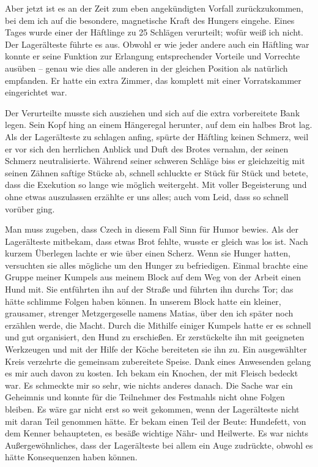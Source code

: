 \documentclass[a4paper,12pt,ngerman,
]{nisebook}
\begin{document}
Aber jetzt ist es an der Zeit zum eben angekündigten Vorfall zurückzukommen, bei dem ich auf die besondere, magnetische Kraft des Hungers eingehe. Eines Tages wurde einer der Häftlinge zu 25 Schlägen verurteilt; wofür weiß ich nicht. Der Lagerälteste führte es aus. Obwohl er wie jeder andere auch ein Häftling war konnte er seine Funktion zur Erlangung entsprechender Vorteile und Vorrechte ausüben -- genau wie dies alle anderen in der gleichen Position als natürlich empfanden. Er hatte ein extra Zimmer, das komplett mit einer Vorratskammer eingerichtet war.

Der Verurteilte musste sich ausziehen und sich auf die extra vorbereitete Bank legen. Sein Kopf hing an einem Hängeregal herunter, auf dem ein halbes Brot lag. Als der Lagerälteste zu schlagen anfing, spürte der Häftling keinen Schmerz, weil er vor sich den herrlichen Anblick und Duft des Brotes vernahm, der seinen Schmerz neutralisierte. Während seiner schweren Schläge biss er gleichzeitig mit seinen Zähnen saftige Stücke ab, schnell schluckte er Stück für Stück und betete, dass die Exekution so lange wie möglich weitergeht. Mit voller Begeisterung und ohne etwas auszulassen erzählte er uns alles; auch vom Leid, dass so schnell vorüber ging.

Man muss zugeben, dass Czech in diesem Fall Sinn für Humor bewies. Als der Lagerälteste mitbekam, dass etwas Brot fehlte, wusste er gleich was los ist. 
Nach kurzem Überlegen lachte er wie über einen Scherz. Wenn sie Hunger hatten, versuchten sie alles mögliche um den Hunger zu befriedigen. Einmal brachte eine Gruppe meiner Kumpels aus meinem Block auf dem Weg von der Arbeit einen Hund mit. Sie entführten ihn auf der Straße und führten ihn durchs Tor; das hätte schlimme Folgen haben können. In unserem Block hatte ein kleiner, grausamer, strenger Metzgergeselle namens Matias, über den ich später noch erzählen werde, die Macht. Durch die Mithilfe einiger Kumpels hatte er es schnell und gut organisiert, den Hund zu erschießen. Er zerstückelte ihn mit geeigneten Werkzeugen und mit der Hilfe der Köche bereiteten sie ihn zu. Ein ausgewählter Kreis verzehrte die gemeinsam zubereitete Speise. Dank eines Anwesenden gelang es mir auch davon zu kosten. Ich bekam ein Knochen, der mit Fleisch bedeckt war. Es schmeckte mir so sehr, wie nichts anderes danach. Die Sache war ein Geheimnis und konnte für die Teilnehmer des Festmahls nicht ohne Folgen bleiben. Es wäre gar nicht erst so weit gekommen, wenn der Lagerälteste nicht mit daran Teil genommen hätte. Er bekam einen Teil der Beute: Hundefett, von dem Kenner behaupteten, es besäße wichtige Nähr- und Heilwerte. Es war nichts Außergewöhnliches, dass der Lagerälteste bei allem ein Auge zudrückte, obwohl es hätte Konsequenzen haben können.
\end{document}
